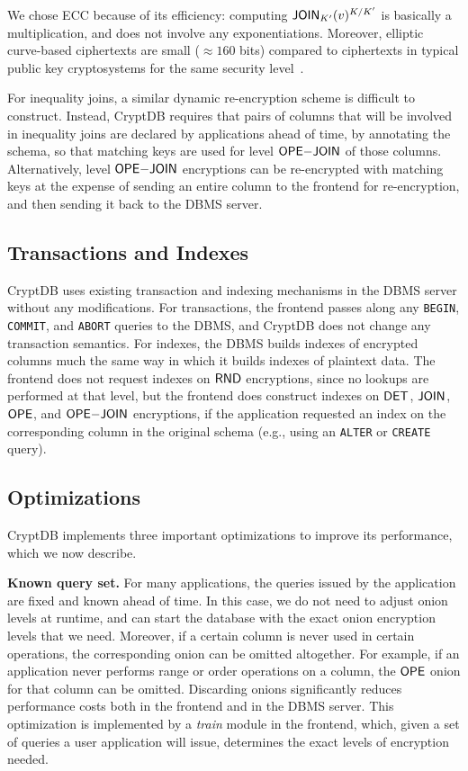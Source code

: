 We chose ECC because of its efficiency: computing $\mathsf{JOIN}_{K'}(v)^{K/K'}$
is basically a multiplication, and does not involve any exponentiations.
Moreover, elliptic curve-based ciphertexts are small ($\approx 160$ bits)
compared to ciphertexts in typical public key cryptosystems for the same
security level~\cite{nsaecc}.

For inequality joins, a similar dynamic re-encryption scheme is difficult
to construct.  Instead, CryptDB requires that pairs of columns that will
be involved in inequality joins are declared by applications ahead of
time, by annotating the schema, so that matching keys are used for level
$\mathsf{OPE}\mathrm{-}\mathsf{JOIN}$ of those columns.  Alternatively, level $\mathsf{OPE}\mathrm{-}\mathsf{JOIN}$ encryptions
can be re-encrypted with matching keys at the expense of sending an entire
column to the frontend for re-encryption, and then sending it back
to the DBMS server.


\subsection{Transactions and Indexes}

CryptDB uses existing transaction and indexing mechanisms in the
DBMS server without any modifications.  For transactions, the
frontend passes along any {\tt BEGIN}, {\tt COMMIT}, and
{\tt ABORT} queries to the DBMS, and CryptDB does not change any
transaction semantics.  For indexes, the DBMS builds indexes
of encrypted columns much the same way in which it builds
indexes of plaintext data.  The frontend does not request
indexes on $\mathsf{RND}$ encryptions, since no lookups are performed
at that level, but the frontend does construct indexes on
$\mathsf{DET}$, $\mathsf{JOIN}$, $\mathsf{OPE}$, and $\mathsf{OPE}\mathrm{-}\mathsf{JOIN}$ encryptions, if the
application requested an index on the corresponding column
in the original schema (e.g., using an {\tt ALTER} or {\tt CREATE}
query).


\subsection{Optimizations}
\label{ss:optimize}

CryptDB implements three important optimizations to improve
its performance, which we now describe.

\textbf{Known query set.}  For many applications, the queries issued
by the application are fixed and known ahead of time.  In this case, we
do not need to adjust onion levels at runtime, and can start the database
with the exact onion encryption levels that we need.  Moreover, if a
certain column is never used in certain operations, the corresponding
onion can be omitted altogether.  For example, if an application never
performs range or order operations on a column, the $\mathsf{OPE}$ onion for
that column can be omitted.  Discarding onions significantly reduces
performance costs both in the frontend and in the DBMS server.  This
optimization is implemented by a \textit{train} module in the frontend,
which, given a set of queries a user application will issue, determines
the exact levels of encryption needed.

